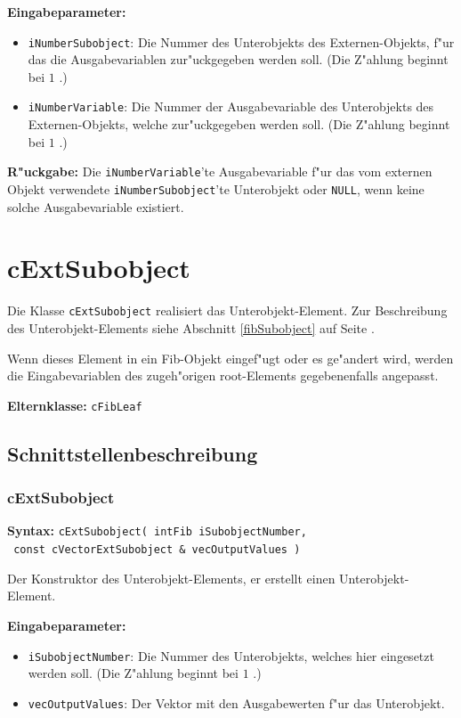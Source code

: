 \bigskip\noindent
\textbf{Eingabeparameter:}
\begin{itemize}
 \item \verb|iNumberSubobject|: Die Nummer des Unterobjekts des Externen-Objekts, f"ur das die Ausgabevariablen zur"uckgegeben werden soll. (Die Z"ahlung beginnt bei $1$ .)
 \item \verb|iNumberVariable|: Die Nummer der Ausgabevariable des Unterobjekts des Externen-Objekts, welche zur"uckgegeben werden soll. (Die Z"ahlung beginnt bei $1$ .)
\end{itemize}

\bigskip\noindent
\textbf{R"uckgabe:} Die \verb|iNumberVariable|'te Ausgabevariable f"ur das vom externen Objekt verwendete \verb|iNumberSubobject|'te Unterobjekt oder \verb|NULL|, wenn keine solche Ausgabevariable existiert.



\section{cExtSubobject}
\label{secCExtSubobject}\label{secCExtSubobjectElement}

Die Klasse \verb|cExtSubobject| realisiert das Unterobjekt-Element.
Zur Beschreibung des Unterobjekt-Elements siehe Abschnitt \ref{fibSubobject} auf Seite \pageref{fibSubobject} .

Wenn dieses Element in ein Fib-Objekt eingef"ugt oder es ge"andert wird, werden die Eingabevariablen des zugeh"origen root-Elements gegebenenfalls angepasst.

\bigskip\noindent
\textbf{Elternklasse:} \verb|cFibLeaf|


\subsection{Schnittstellenbeschreibung}

\subsubsection{cExtSubobject}

\textbf{Syntax:} \verb|cExtSubobject( intFib iSubobjectNumber,| \\\verb| const cVectorExtSubobject & vecOutputValues )|

\bigskip\noindent
Der Konstruktor des Unterobjekt-Elements, er erstellt einen Unterobjekt-Element.

\bigskip\noindent
\textbf{Eingabeparameter:}
\begin{itemize}
 \item \verb|iSubobjectNumber|: Die Nummer des Unterobjekts, welches hier eingesetzt werden soll. (Die Z"ahlung beginnt bei $1$ .)
 \item \verb|vecOutputValues|: Der Vektor mit den Ausgabewerten f"ur das Unterobjekt. 
\end{itemize}

